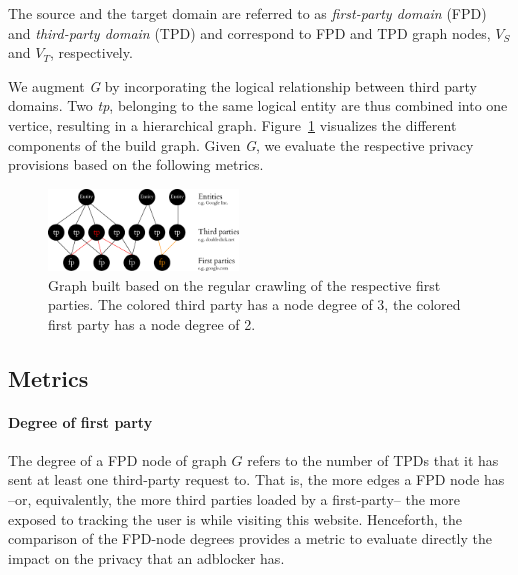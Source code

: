 \documentclass{sig-alternate}
\begin{document}
The source and the target domain are referred to as \textit{first-party domain} (FPD) and \textit{third-party domain} (TPD) and correspond to FPD and TPD graph nodes, $V_S$ and $V_T$, respectively.

We augment \emph{G} by incorporating the logical relationship between third party domains. Two \emph{tp}, belonging to the same logical entity are thus combined into one vertice, resulting in a hierarchical graph. Figure~\ref{fig:graph} visualizes the different components of the build graph. Given \emph{G}, we evaluate the respective privacy provisions based on the following metrics.

\begin{figure}[htb!]
  \centering
  \includegraphics[width=0.45\textwidth]{figures/graph.eps}
  \caption{Graph built based on the regular crawling of the respective first parties. The colored third party has a node degree of 3, the colored first party has a node degree of 2.}\label{fig:graph}
\end{figure}

\subsection{Metrics}
\paragraph{Degree of first party}
The degree of a FPD node of graph $G$ refers to the number of TPDs that it has sent at least one third-party request to. That is, the more edges a FPD node has --or, equivalently, the more third parties loaded by a first-party-- the more exposed to tracking the user is while visiting this website. Henceforth, the comparison of the FPD-node degrees provides a metric to evaluate directly the impact on the privacy that an adblocker has.
\end{document}
